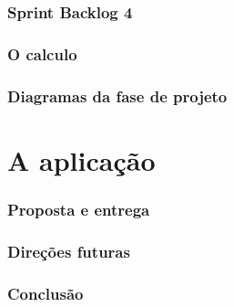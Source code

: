 \documentclass[12pt,a4paper]{beamer}
\begin{document}
		\section{Sprint Backlog 4}
		\section{O calculo}
		\section{Diagramas da fase de projeto}
	\part{A aplicação}
		\section{Proposta e entrega}
		\section{Direções futuras}
		\section{Conclusão}
		
\end{document}
